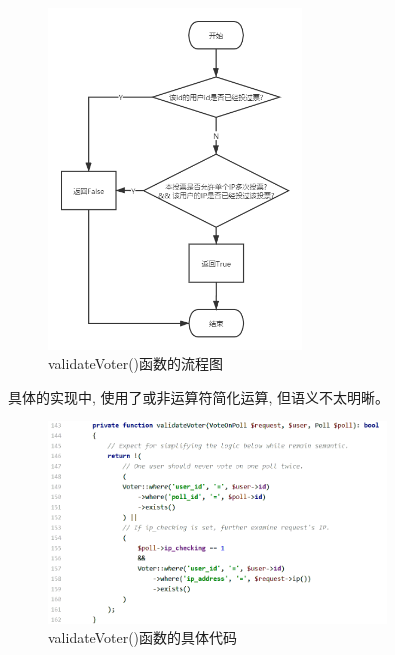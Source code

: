 \begin{figure}[hb]
    \centering
    \includegraphics[width=0.60\textwidth]{support-files/4.5.2-validate-voter-flowchart.png}
    \caption{validateVoter()函数的流程图}
    \label{fig:validatevoterchart}
\end{figure}


具体的实现中, 使用了或非运算符简化运算, 但语义不太明晰。

\begin{figure}[h]
    \centering
    \includegraphics[width=0.8\textwidth]{support-files/4.5.2-validate-voter-code.png}
    \caption{validateVoter()函数的具体代码}
    \label{fig:validatevotercode}
\end{figure}



